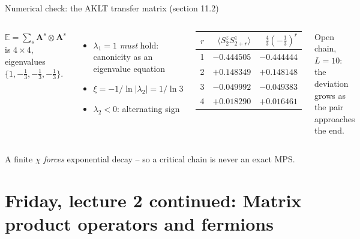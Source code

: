 \documentclass[aspectratio=169,10pt]{beamer}
\newcommand{\bmat}[1]{\bm{#1}}
\begin{document}
\begin{frame}{Numerical check: the AKLT transfer matrix (section 11.2)}
  \begin{columns}[T]
    $\mathbb E=\sum_s\bmat A^s\otimes\bmat A^s$ is $4\times4$, eigenvalues $\{1,-\tfrac13,-\tfrac13,-\tfrac13\}$.
    \vspace{0.4em}
    \small
    \begin{itemize}
      \item $\lambda_1=1$ \emph{must} hold: canonicity as an eigenvalue equation
      \item $\xi=-1/\ln|\lambda_2|=1/\ln3$
      \item $\lambda_2<0$: alternating sign
    \end{itemize}
    \begin{center}\small
    \begin{tabular}{@{}rrr@{}}\toprule
    $r$ & $\langle S^z_2S^z_{2+r}\rangle$ & $\frac43(-\frac13)^r$\\\midrule
    1 & $-0.444505$ & $-0.444444$\\
    2 & $+0.148349$ & $+0.148148$\\
    3 & $-0.049992$ & $-0.049383$\\
    4 & $+0.018290$ & $+0.016461$\\\bottomrule
    \end{tabular}
    \end{center}
    \centering\scriptsize Open chain, $L=10$: the deviation grows as the pair approaches the end.
  \end{columns}
  \vspace{0.6em}
  \centering A finite $\chi$ \emph{forces} exponential decay -- so a critical chain is never an exact MPS.
\end{frame}

\section{Friday, lecture 2 continued: Matrix product operators and fermions}
\end{document}
